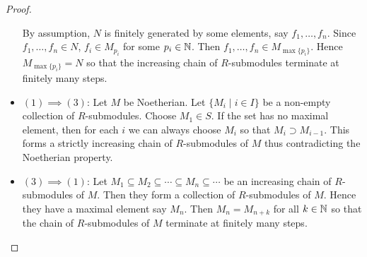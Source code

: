 \documentclass[a4paper]{article}
\begin{document}
\begin{prp}{}{}
\begin{proof}
\begin{itemize}
By assumption, $N$ is finitely generated by some elements, say $f_1,\dots,f_n$. Since $f_1,\dots,f_n\in N$, $f_i\in M_{p_i}$ for some $p_i\in\mathbb{N}$. Then $f_1,\dots,f_n\in M_{\max\{p_i\}}$. Hence $M_{\max\{p_i\}}=N$ so that the increasing chain of $R$-submodules terminate at finitely many steps. 
\item $(1)\implies(3)$: Let $M$ be Noetherian. Let $\{M_i\;|\;i\in I\}$ be a non-empty collection of $R$-submodules. Choose $M_1\in S$. If the set has no maximal element, then for each $i$ we can always choose $M_i$ so that $M_i\supset M_{i-1}$. This forms a strictly increasing chain of $R$-submodules of $M$ thus contradicting the Noetherian property. 
\item $(3)\implies(1)$: Let $M_1\subseteq M_2\subseteq\cdots\subseteq M_n\subseteq\cdots$ be an increasing chain of $R$-submodules of $M$. Then they form a collection of $R$-submodules of $M$. Hence they have a maximal element say $M_n$. Then $M_n=M_{n+k}$ for all $k\in\mathbb{N}$ so that the chain of $R$-submodules of $M$ terminate at finitely many steps. 
\end{itemize}
\end{proof}
\end{prp}
\end{document}
